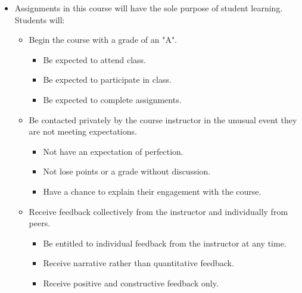 \documentclass[11pt]{article}
\begin{document}
\begin{itemize}
    \item Assignments in this course will have the sole purpose of student learning. Students will:
        \begin{itemize}
            \item  Begin the course with a grade of an "A".
            \begin{itemize}
                \item  Be expected to attend class.
                \item  Be expected to participate in class.
                \item  Be expected to complete assignments.
            \end{itemize}
            \item  Be contacted privately by the course instructor in the unusual event they are not meeting expectations.
            \begin{itemize}
                \item  Not have an expectation of perfection.
                \item  Not lose points or a grade without discussion.
                \item  Have a chance to explain their engagement with the course.
            \end{itemize}
            \item  Receive feedback collectively from the instructor and individually from peers.
            \begin{itemize}
                \item  Be entitled to individual feedback from the instructor at any time.
                \item  Receive narrative rather than quantitative feedback.
                \item  Receive positive and constructive feedback only.
            \end{itemize}
        \end{itemize}
\end{itemize}


\end{document}

